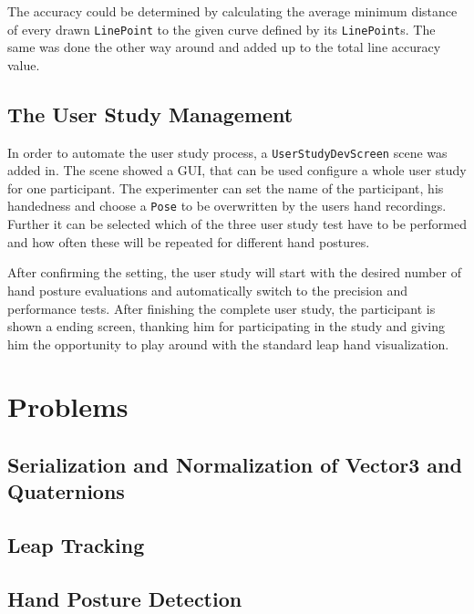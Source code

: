The accuracy could be determined by calculating the average minimum distance of every drawn \texttt{LinePoint} to the given curve defined by its \texttt{LinePoint}s. The same was done the other way around and added up to the total line accuracy value. 

\subsection{The User Study Management}

In order to automate the user study process, a \texttt{UserStudyDevScreen} scene was added in. The scene showed a GUI, that can be used configure a whole user study for one participant. The experimenter can set the name of the participant, his handedness and choose a \texttt{Pose} to be overwritten by the users hand recordings. Further it can be selected which of the three user study test have to be performed and how often these will be repeated for different hand postures. 

After confirming the setting, the user study will start with the desired number of hand posture evaluations and automatically switch to the precision and performance tests. After finishing the complete user study, the participant is shown a ending screen, thanking him for participating in the study and giving him the opportunity to play around with the standard leap hand visualization. 

\section{Problems}

\subsection{Serialization and Normalization of Vector3 and Quaternions}

\subsection{Leap Tracking}

\subsection{Hand Posture Detection}

